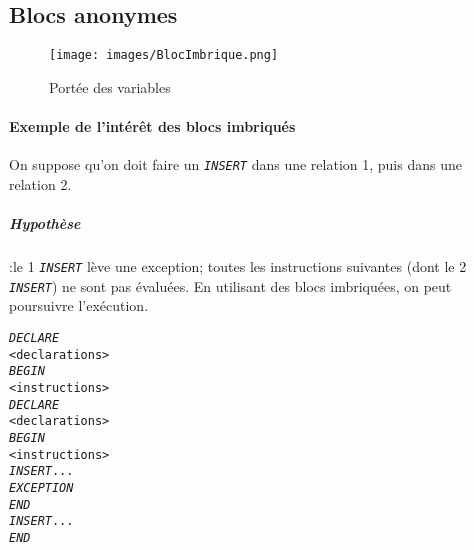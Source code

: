 \documentclass[10pt]{article}
\begin{document}
        \subsection{Blocs anonymes}
            \begin{figure}[H]
                \begin{center}
                    \texttt{[image: images/BlocImbrique.png]}
                \end{center}
                \caption{Portée des variables}
            \end{figure}


            \paragraph{Exemple de l'intérêt des blocs imbriqués}
                On suppose qu'on doit faire un \emph{\texttt{INSERT}} dans une relation 1, puis dans une relation 2.

                \subparagraph{Hypothèse} :le 1 \emph{\texttt{INSERT}} lève une exception; toutes les instructions suivantes (dont le 2 \emph{\texttt{INSERT}}) ne sont pas évaluées. En utilisant des blocs imbriquées, on peut poursuivre l'exécution.

                \begin{alltt}
                    \begin{tabbing}
                        \emph{DECLARE}\=\\
                            \><declarations>\\
                        \emph{BEGIN}\=\\
                            \><instructions>\\
                            \>\emph{DECLARE}\=\\
                                \>\><declarations>\\
                            \>\emph{BEGIN}\=\\
                                \>\><instructions>\\
                                \>\>\emph{INSERT} ...\\
                            \>\emph{EXCEPTION}\\
                            \>\emph{END}\\
                            \>\emph{INSERT} ... \\
                        \emph{END}
                    \end{tabbing}
                \end{alltt}
\end{document}
